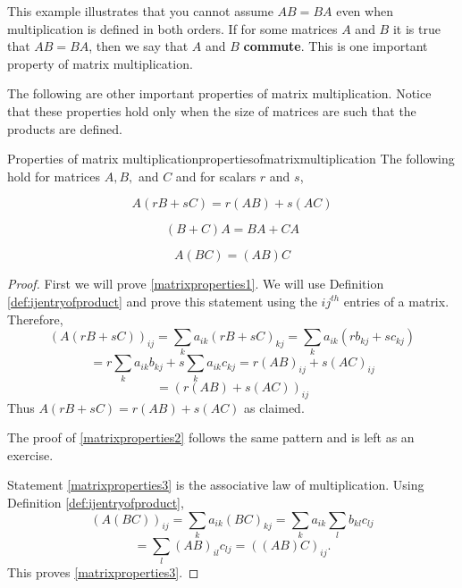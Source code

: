This example illustrates that you cannot assume $AB=BA$ even when
multiplication is defined in both orders. If for some matrices $A$ and
$B$ it is true that $AB=BA$, then we say that $A$ and $B$ \textbf{commute}. This is one 
important property of matrix multiplication.

The following are other important properties of matrix multiplication.
Notice that these properties hold only when the size of matrices are such that the products are defined. 

\begin{proposition}{Properties of matrix multiplication}{propertiesofmatrixmultiplication}
The following hold for matrices $A,B,$ and $C$ and for scalars $r$ and $s$,

\begin{equation}
A\left( rB+sC\right) =r\left( AB\right) +s\left( AC\right)  \label{matrixproperties1}
\end{equation}

\begin{equation}
\left( B+C\right) A=BA+CA  \label{matrixproperties2}
\end{equation}

\begin{equation}
A\left( BC\right) =\left( AB\right) C  \label{matrixproperties3}
\end{equation}
\end{proposition}

\begin{proof}
 First we will prove \ref{matrixproperties1}. We will use Definition \ref{def:ijentryofproduct} 
and prove this statement using the $ij^{th}$ entries of a matrix. 
Therefore, 
\begin{equation*}
\left( A\left( rB+sC\right) \right) _{ij}=\sum_{k}a_{ik}\left( rB+sC\right)
_{kj}=\sum_{k}a_{ik}\left( rb_{kj}+sc_{kj}\right)
\end{equation*}
\begin{equation*}
=r\sum_{k}a_{ik}b_{kj}+s\sum_{k}a_{ik}c_{kj}=r\left( AB\right) _{ij}+s\left(
AC\right) _{ij}
\end{equation*}
\begin{equation*}
=\left( r\left( AB\right) +s\left( AC\right) \right) _{ij}
\end{equation*}
Thus $A\left( rB+sC\right) =r(AB)+s(AC)$ as claimed. 

The proof of \ref{matrixproperties2} follows the same pattern and is left as an exercise. 

Statement \ref{matrixproperties3} is the associative law of multiplication. Using
Definition \ref{def:ijentryofproduct},
\begin{equation*}
\left( A\left( BC\right) \right) _{ij}=\sum_{k}a_{ik}\left( BC\right)
_{kj}=\sum_{k}a_{ik}\sum_{l}b_{kl}c_{lj}
\end{equation*}
\begin{equation*}
=\sum_{l}\left( AB\right) _{il}c_{lj}=\left( \left( AB\right) C\right) _{ij}.
\end{equation*}
This proves \ref{matrixproperties3}.
\end{proof}

